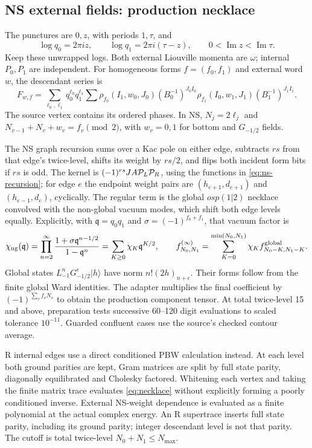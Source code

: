 \documentclass[11pt]{article}
\begin{document}
\subsection{NS external fields: production necklace}
The punctures are \(0,z\), with periods \(1,\tau\), and
\begin{equation}
 \log q_0=2\pi iz,\qquad \log q_1=2\pi i(\tau-z),\qquad
 0<\operatorname{Im}z<\operatorname{Im}\tau.
\end{equation}
Keep these unwrapped logs. Both external Liouville momenta are
\(\omega\); internal \(P_0,P_1\) are independent. For homogeneous
forms \(f=(f_0,f_1)\) and external word \(w\), the descendant series is
\begin{equation}
 F_{w,f}=\sum_{\ell_0,\ell_1}q_0^{\ell_0}q_1^{\ell_1}
 \sum\rho_{f_0}(I_1,w_0,J_0)(B_0^{-1})^{J_0I_0}
     \rho_{f_1}(I_0,w_1,J_1)(B_1^{-1})^{J_1I_1}.
 \label{eq:necklace}
\end{equation}
The source vertex contains its ordered phases. In NS, \(N_j=2\ell_j\)
and \(N_{v-1}+N_v+w_v=f_v\pmod2\), with \(w_v=0,1\) for bottom
and \(G_{-1/2}\) fields.

The NS graph recursion sums over a Kac pole on either edge, subtracts
\(rs\) from that edge's twice-level, shifts its weight by \(rs/2\),
and flips both incident form bits if \(rs\) is odd.
The kernel is \((-1)^{rs}JA{\cal P}_L{\cal P}_R\), using the functions
in \eqref{eq:ns-recursion}; for edge \(e\) the endpoint weight pairs are
\((h_{e+1},d_{e+1})\) and \((h_{e-1},d_e)\), cyclically.
The regular term is the global \(osp(1|2)\) necklace convolved with
the non-global vacuum modes, which shift both edge levels equally.
Explicitly, with \(\mathfrak q=q_0q_1\) and
\(\sigma=(-1)^{f_0+f_1}\), that vacuum factor is
\[
 \chi_{\rm ng}(\mathfrak q)=\prod_{n=2}^{\infty}
 \frac{1+\sigma\mathfrak q^{n-1/2}}{1-\mathfrak q^n}
 =\sum_{K\ge0}\chi_K\mathfrak q^{K/2},\qquad
 f^{(\infty)}_{N_0,N_1}=\sum_{K=0}^{\min(N_0,N_1)}
 \chi_K f^{\rm global}_{N_0-K,N_1-K}.
\]
Global states \(L_{-1}^nG_{-1/2}^{\epsilon}|h\rangle\) have norm
\(n!(2h)_{n+\epsilon}\). Their forms follow from the finite global
Ward identities. The adapter multiplies the final coefficient by
\((-1)^{\sum_vf_vN_v}\) to obtain the production component tensor.
At total twice-level 15 and above, preparation tests successive
60--120 digit evaluations to scaled tolerance \(10^{-11}\).
Guarded confluent cases use the source's checked contour average.

R internal edges use a direct conditioned PBW calculation instead.
At each level both ground parities are kept, Gram matrices are split
by full state parity, diagonally equilibrated and Cholesky factored.
Whitening each vertex and taking the finite matrix trace evaluates
\eqref{eq:necklace} without explicitly forming a poorly conditioned
inverse. External NS-weight dependence is evaluated as a finite
polynomial at the actual complex energy.
An R supertrace inserts full state parity, including its ground
parity; integer descendant level is not that parity.
The cutoff is total twice-level \(N_0+N_1\le N_{\max}\).
\end{document}
